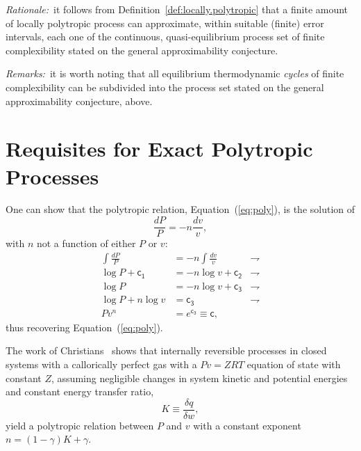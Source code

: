 \documentclass[fleqn,11pt]{SelfArx}
\begin{document}
    \noindent\textit{Rationale:\/}~it follows from Definition~\ref{def:locally.polytropic}  that
    a finite amount of locally polytropic process  can  approximate,  within  suitable  (finite)
    error intervals, each one  of  the  continuous,  quasi-equilibrium  process  set  of  finite
    complexibility stated on the general approximability conjecture.\vspace{1ex}

    \noindent\textit{Remarks:\/}~it  is  worth  noting  that   all   equilibrium   thermodynamic
    \emph{cycles} of finite complexibility can be subdivided into the process set stated on  the
    general approximability conjecture, above.

\section{Requisites for Exact Polytropic Processes}

    One can show that the polytropic relation, Equation~(\ref{eq:poly}), is the solution of
    \begin{equation}
        \frac{dP}{P} = -n\frac{dv}{v},
        \label{eq:poly.ODE}
    \end{equation}
    \noindent with $n$ not a function of either $P$ or $v$:
    \begin{align}
        \int\frac{dP}{P} & = -n\int\frac{dv}{v} & \rightharpoondown
        \\
        \log P + \mathsf{c_1} & = -n\log v + \mathsf{c_2} & \rightharpoondown
        \\
        \log P & = -n\log v + \mathsf{c_3} & \rightharpoondown
        \\
        \log P + n\log v & = \mathsf{c_3} & \rightharpoondown
        \\
        Pv^n & = e^{\mathsf{c_3}} \equiv \mathsf{c},
    \end{align}
    \noindent thus recovering Equation~(\ref{eq:poly}).

    The  work  of  Christians~\cite{2012-ChristiansJ-IntJMechEngEduc}  shows   that   internally
    reversible processes in closed systems with a callorically perfect gas with  a  $Pv  =  ZRT$
    equation of state with constant $Z$, assuming  negligible  changes  in  system  kinetic  and
    potential energies and constant energy transfer ratio,
    \begin{equation}
        K \equiv \frac{\delta q}{\delta w},
        \label{eq:def.K}
    \end{equation}
    \noindent yield a polytropic relation between $P$ and $v$ with a constant exponent $n = (1 -
    \gamma)K + \gamma$.
\end{document}

